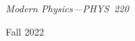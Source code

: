 {\LARGE {\em 
\noindent Modern Physics---PHYS~220
\vspace{0.5mm}

\noindent Fall 2022
\vspace{3mm}
}}

